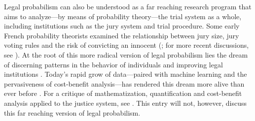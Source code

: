 \documentclass{article}
\begin{document}
Legal probabilism can also be understood as a far reaching research program that aims to analyze---by means of probability theory---the trial system as a whole, including institutions such as the jury system and trial procedure. Some early French probability theorists examined the relationship between jury size, jury voting rules and the risk of convicting an innocent  
(\citealp{condorcet1785, Laplace1814, Poisson1837}; for more recent discussions, see \citealp{kaye1980, nitzan2010, suzuki2015}).
%
At the root of this more radical version of legal probabilism lies the dream of discerning patterns in the behavior of individuals and improving legal institutions \citep{hacking1990}. Today's rapid grow of data---paired with machine learning and the pervasiveness of cost-benefit analysis---has rendered  this dream more alive than ever before \citep{ferguson2020bigdata}. 
For a critique of mathematization, quantification and cost-benefit analysis applied to the justice system, see \citep{harcourt2018}. 
This entry will not, however, discuss this far reaching version of legal probabilism.


\tableofcontents



\end{document}
